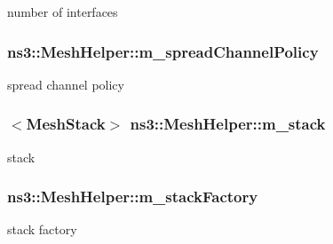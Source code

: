 number of interfaces 

\subsubsection[{\texorpdfstring{m\+\_\+spread\+Channel\+Policy}{m_spreadChannelPolicy}}]{ ns3\+::\+Mesh\+Helper\+::m\+\_\+spread\+Channel\+Policy\hspace{0.3cm}{\ttfamily [private]}}\hypertarget{classns3_1_1MeshHelper_a7116749ed4e2c0ab6bec633a3613bed4}{}\label{classns3_1_1MeshHelper_a7116749ed4e2c0ab6bec633a3613bed4}


spread channel policy 

\subsubsection[{\texorpdfstring{m\+\_\+stack}{m_stack}}]{$<${\bf Mesh\+Stack}$>$ ns3\+::\+Mesh\+Helper\+::m\+\_\+stack\hspace{0.3cm}{\ttfamily [private]}}\hypertarget{classns3_1_1MeshHelper_a35867a1d4a69b963c79d7c2148341967}{}\label{classns3_1_1MeshHelper_a35867a1d4a69b963c79d7c2148341967}


stack 

\subsubsection[{\texorpdfstring{m\+\_\+stack\+Factory}{m_stackFactory}}]{ ns3\+::\+Mesh\+Helper\+::m\+\_\+stack\+Factory\hspace{0.3cm}{\ttfamily [private]}}\hypertarget{classns3_1_1MeshHelper_a1a8557b965cfd2d7ffbad2948f4d05ab}{}\label{classns3_1_1MeshHelper_a1a8557b965cfd2d7ffbad2948f4d05ab}


stack factory 

